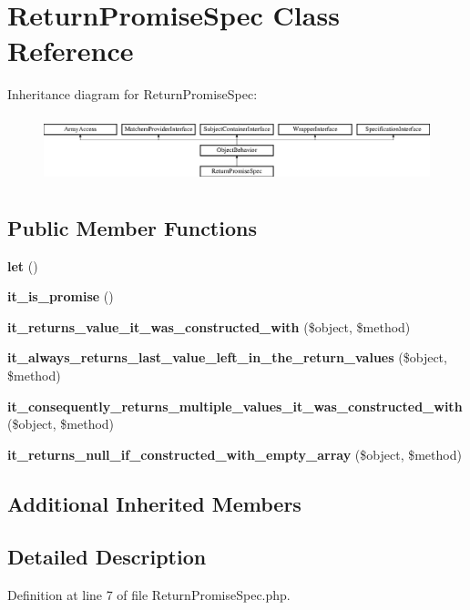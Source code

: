\section{Return\+Promise\+Spec Class Reference}
\label{classspec_1_1_prophecy_1_1_promise_1_1_return_promise_spec}
Inheritance diagram for Return\+Promise\+Spec\+:\begin{figure}[H]
\begin{center}
\leavevmode
\includegraphics[height=1.953488cm]{classspec_1_1_prophecy_1_1_promise_1_1_return_promise_spec}
\end{center}
\end{figure}
\subsection*{Public Member Functions}
\begin{DoxyCompactItemize}
\item 
{\bf let} ()
\item 
{\bf it\+\_\+is\+\_\+promise} ()
\item 
{\bf it\+\_\+returns\+\_\+value\+\_\+it\+\_\+was\+\_\+constructed\+\_\+with} (\$object, \$method)
\item 
{\bf it\+\_\+always\+\_\+returns\+\_\+last\+\_\+value\+\_\+left\+\_\+in\+\_\+the\+\_\+return\+\_\+values} (\$object, \$method)
\item 
{\bf it\+\_\+consequently\+\_\+returns\+\_\+multiple\+\_\+values\+\_\+it\+\_\+was\+\_\+constructed\+\_\+with} (\$object, \$method)
\item 
{\bf it\+\_\+returns\+\_\+null\+\_\+if\+\_\+constructed\+\_\+with\+\_\+empty\+\_\+array} (\$object, \$method)
\end{DoxyCompactItemize}
\subsection*{Additional Inherited Members}


\subsection{Detailed Description}


Definition at line 7 of file Return\+Promise\+Spec.\+php.



